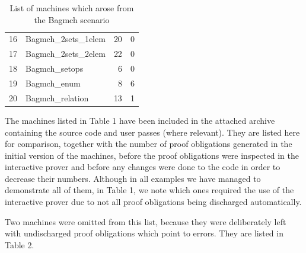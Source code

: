 \documentclass[11pt,journal]{IEEEtran}
\begin{document}
\begin{table}[h]
\begin{tabular}{@{}rlrr@{}}
	16                          & Bagmch\_2sets\_1elem        & 20                                                                           & 0                                                                                       \\
	17                          & Bagmch\_2sets\_2elem        & 22                                                                           & 0                                                                                       \\
	18                          & Bagmch\_setops              & 6                                                                            & 0                                                                                       \\
	19                          & Bagmch\_enum                & 8                                                                            & 6                                                                                       \\
	20                          & Bagmch\_relation            & 13                                                                           & 1                                                                                       \\ \bottomrule
\end{tabular}
			
	\caption{List of machines which arose from the Bagmch scenario}
\end{table}
	The machines listed in Table 1 have been included in the attached archive containing the source code and user passes (where relevant). They are listed here for comparison, together with the number of proof obligations generated in the initial version of the machines, before the proof obligations were inspected in the interactive prover and before any changes were done to the code in order to decrease their numbers. Although in all examples we have managed to demonstrate all of them, in Table 1, we note which ones required the use of the interactive prover due to not all proof obligations being discharged automatically.
	
	Two machines were omitted from this list, because they were deliberately left with undischarged proof obligations which point to errors. They are listed in Table 2.
	
\end{document}
